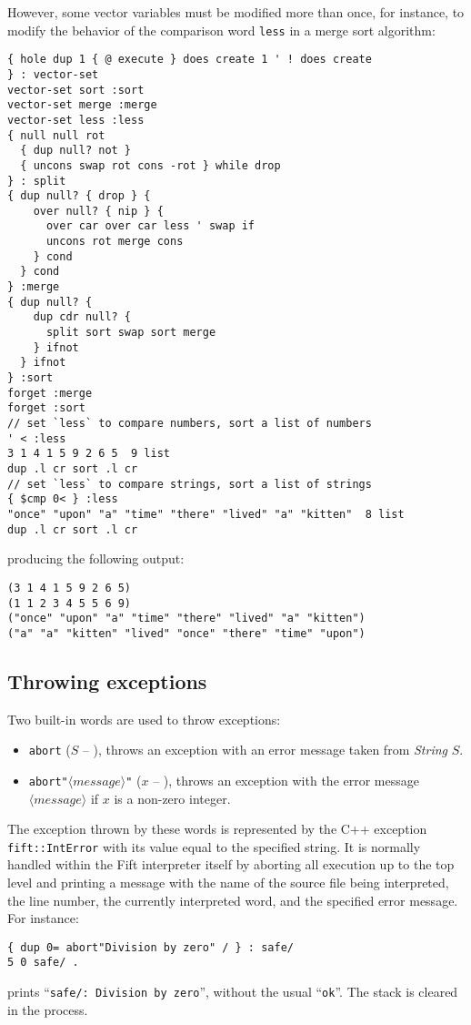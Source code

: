 \documentclass[12pt,oneside]{article}
\def\mysubsection#1{\subsection{#1}\fancyhead[C]{\small{\textsc{\textrm{\thesubsection.} #1}}}}
\begin{document}
However, some vector variables must be modified more than once, for instance, to modify the behavior of the comparison word {\tt less} in a merge sort algorithm:
\begin{verbatim}
{ hole dup 1 { @ execute } does create 1 ' ! does create
} : vector-set
vector-set sort :sort
vector-set merge :merge
vector-set less :less
{ null null rot
  { dup null? not }
  { uncons swap rot cons -rot } while drop
} : split
{ dup null? { drop } {
    over null? { nip } {
      over car over car less ' swap if
      uncons rot merge cons
    } cond
  } cond
} :merge
{ dup null? {
    dup cdr null? {
      split sort swap sort merge
    } ifnot
  } ifnot
} :sort
forget :merge
forget :sort
// set `less` to compare numbers, sort a list of numbers
' < :less
3 1 4 1 5 9 2 6 5  9 list
dup .l cr sort .l cr
// set `less` to compare strings, sort a list of strings
{ $cmp 0< } :less
"once" "upon" "a" "time" "there" "lived" "a" "kitten"  8 list
dup .l cr sort .l cr
\end{verbatim}
producing the following output:
\begin{verbatim}
(3 1 4 1 5 9 2 6 5) 
(1 1 2 3 4 5 5 6 9) 
("once" "upon" "a" "time" "there" "lived" "a" "kitten") 
("a" "a" "kitten" "lived" "once" "there" "time" "upon") 
\end{verbatim}

\mysubsection{Throwing exceptions}\label{p:exception.ops}
Two built-in words are used to throw exceptions:
\begin{itemize}
\item {\tt abort} ($S$ -- ), throws an exception with an error message taken from {\em String\/} $S$.
\item {\tt abort"$\langle\textit{message}\rangle$"} ($x$ -- ), throws an exception with the error message $\langle\textit{message}\rangle$ if $x$ is a non-zero integer.
\end{itemize}
The exception thrown by these words is represented by the C++ exception {\tt fift::IntError} with its value equal to the specified string. It is normally handled within the Fift interpreter itself by aborting all execution up to the top level and printing a message with the name of the source file being interpreted, the line number, the currently interpreted word, and the specified error message. For instance:
\begin{verbatim}
{ dup 0= abort"Division by zero" / } : safe/
5 0 safe/ .
\end{verbatim}
prints ``{\tt safe/: Division by zero}'', without the usual ``{\tt ok}''. The stack is cleared in the process.
\end{document}
